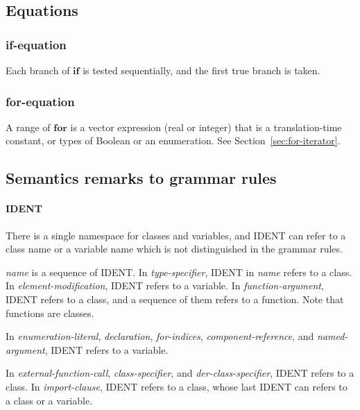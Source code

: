 \documentclass[10pt,b5paper]{article}
\begin{document}

\subsection{Equations}

\subsubsection*{if-equation}

Each branch of $\mathbf{if}$ is tested sequentially, and the first
true branch is taken.

\subsubsection*{for-equation}

A range of $\mathbf{for}$ is a vector expression (real or integer)
that is a translation-time constant, or types of Boolean or an
enumeration.  See Section~\ref{sec:for-iterator}.


\subsection{Semantics remarks to grammar rules}

\paragraph {IDENT}

There is a single namespace for classes and variables, and {IDENT} can
refer to a class name or a variable name which is not distinguished in
the grammar rules.

{\it{}name\/} is a sequence of {IDENT}.  In {\it{}type-specifier},
IDENT in {\it{}name\/} refers to a class.  In
{\it{}element-modification}, IDENT refers to a variable.  In
{\it{}function-argument}, IDENT refers to a class, and a sequence of
them refers to a function.  Note that functions are classes.

In {\it{}enumeration-literal}, {\it{}declaration}, {\it{}for-indices},
{\it{}component-reference}, and {\it{}named-argument}, IDENT refers to
a variable.

In {\it{}external-function-call}, {\it{}class-specifier}, and
{\it{}der-class-specifier}, IDENT refers to a class.  In
{\it{}import-clause}, IDENT refers to a class, whose last IDENT can
refers to a class or a variable.
\end{document}
